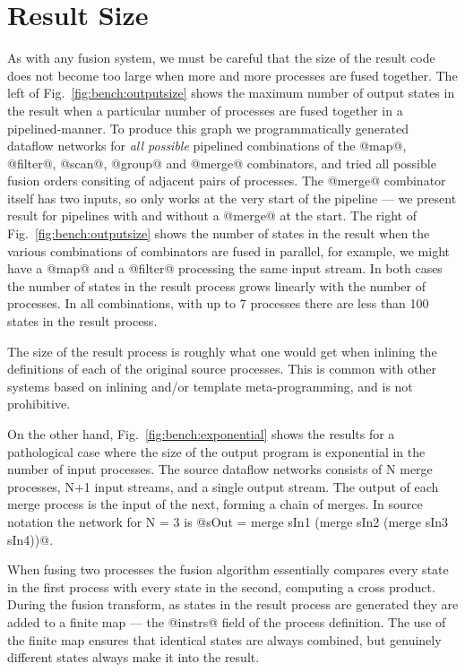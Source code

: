 \section{Result Size}

As with any fusion system, we must be careful that the size of the result code does not become too large when more and more processes are fused together. The left of Fig.~\ref{fig:bench:outputsize} shows the maximum number of output states in the result when a particular number of processes are fused together in a pipelined-manner. To produce this graph we programmatically generated dataflow networks for \emph{all possible} pipelined combinations of the @map@, @filter@, @scan@, @group@ and @merge@ combinators, and tried all possible fusion orders consiting of adjacent pairs of processes. The @merge@ combinator itself has two inputs, so only works at the very start of the pipeline --- we present result for pipelines with and without a @merge@ at the start. The right of Fig.~\ref{fig:bench:outputsize} shows the number of states in the result when the various combinations of combinators are fused in parallel, for example, we might have a @map@ and a @filter@ processing the same input stream. In both cases the number of states in the result process grows linearly with the number of processes. In all combinations, with up to 7 processes there are less than 100 states in the result process. 

The size of the result process is roughly what one would get when inlining the definitions of each of the original source processes. This is common with other systems based on inlining and/or template meta-programming, and is not prohibitive.

On the other hand, Fig.~\ref{fig:bench:exponential} shows the results for a pathological case where the size of the output program is exponential in the number of input processes. The source dataflow networks consists of N merge processes, N+1 input streams, and a single output stream. The output of each merge process is the input of the next, forming a chain of merges. In source notation the network for N = 3 is @sOut = merge sIn1 (merge sIn2 (merge sIn3 sIn4))@.

When fusing two processes the fusion algorithm essentially compares every state in the first process with every state in the second, computing a cross product. During the fusion transform, as states in the result process are generated they are added to a finite map --- the @instrs@ field of the process definition. The use of the finite map ensures that identical states are always combined, but genuinely different states always make it into the result. 

